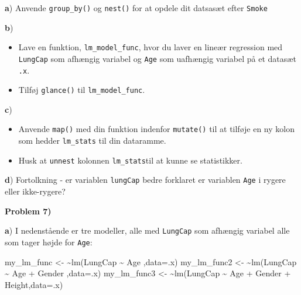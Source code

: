 \documentclass[
]{book}
\newenvironment{Shaded}{\begin{snugshade}}{\end{snugshade}}
\newcommand{\AttributeTok}[1]{\textcolor[rgb]{0.77,0.63,0.00}{#1}}
\newcommand{\ErrorTok}[1]{\textcolor[rgb]{0.64,0.00,0.00}{\textbf{#1}}}
\newcommand{\FunctionTok}[1]{\textcolor[rgb]{0.00,0.00,0.00}{#1}}
\newcommand{\NormalTok}[1]{#1}
\newcommand{\OtherTok}[1]{\textcolor[rgb]{0.56,0.35,0.01}{#1}}
\newcommand{\SpecialCharTok}[1]{\textcolor[rgb]{0.00,0.00,0.00}{#1}}
\providecommand{\tightlist}{%
  \setlength{\itemsep}{0pt}\setlength{\parskip}{0pt}}
\begin{document}
\textbf{a}) Anvende \texttt{group\_by()} og \texttt{nest()} for at opdele dit datsasæt efter \texttt{Smoke}

\textbf{b})

\begin{itemize}
\tightlist
\item
  Lave en funktion, \texttt{lm\_model\_func}, hvor du laver en lineær regression med \texttt{LungCap} som afhængig variabel og \texttt{Age} som uafhængig variabel på et datasæt \texttt{.x}.
\item
  Tilføj \texttt{glance()} til \texttt{lm\_model\_func}.
\end{itemize}

\textbf{c})

\begin{itemize}
\tightlist
\item
  Anvende \texttt{map()} med din funktion indenfor \texttt{mutate()} til at tilføje en ny kolon som hedder \texttt{lm\_stats} til din dataramme.
\item
  Husk at \texttt{unnest} kolonnen \texttt{lm\_stats}til at kunne se statistikker.
\end{itemize}

\textbf{d}) Fortolkning - er variablen \texttt{lungCap} bedre forklaret er variablen \texttt{Age} i rygere eller ikke-rygere?

\textbf{Problem 7)}

\textbf{a}) I nedenstående er tre modeller, alle med \texttt{LungCap} som afhængig variabel alle som tager højde for \texttt{Age}:

\begin{Shaded}
\begin{Highlighting}[]
\NormalTok{my\_lm\_func }\OtherTok{\textless{}{-}}  \ErrorTok{\textasciitilde{}}\FunctionTok{lm}\NormalTok{(LungCap }\SpecialCharTok{\textasciitilde{}}\NormalTok{ Age                  ,}\AttributeTok{data=}\NormalTok{.x)}
\NormalTok{my\_lm\_func2 }\OtherTok{\textless{}{-}} \ErrorTok{\textasciitilde{}}\FunctionTok{lm}\NormalTok{(LungCap }\SpecialCharTok{\textasciitilde{}}\NormalTok{ Age }\SpecialCharTok{+}\NormalTok{ Gender         ,}\AttributeTok{data=}\NormalTok{.x)}
\NormalTok{my\_lm\_func3 }\OtherTok{\textless{}{-}} \ErrorTok{\textasciitilde{}}\FunctionTok{lm}\NormalTok{(LungCap }\SpecialCharTok{\textasciitilde{}}\NormalTok{ Age }\SpecialCharTok{+}\NormalTok{ Gender }\SpecialCharTok{+}\NormalTok{ Height,}\AttributeTok{data=}\NormalTok{.x)}
\end{Highlighting}
\end{Shaded}
\end{document}
